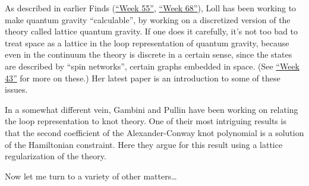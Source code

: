 \documentclass{article}
\renewcommand{\texttt}[1]{%
  \begingroup
  \ttfamily
  \begingroup\lccode`~=`/\lowercase{\endgroup\def~}{/\discretionary{}{}{}}%
  \begingroup\lccode`~=`[\lowercase{\endgroup\def~}{[\discretionary{}{}{}}%
  \begingroup\lccode`~=`.\lowercase{\endgroup\def~}{.\discretionary{}{}{}}%
  \catcode`/=\active\catcode`[=\active\catcode`.=\active
  \scantokens{#1\noexpand}%
  \endgroup
}
\begin{document}
As described in earlier Finds (\protect\hyperlink{week55}{``Week 55''},
\protect\hyperlink{week68}{``Week 68''}), Loll has been working to make
quantum gravity ``calculable'', by working on a discretized version of
the theory called lattice quantum gravity. If one does it carefully,
it's not too bad to treat space as a lattice in the loop representation
of quantum gravity, because even in the continuum the theory is discrete
in a certain sense, since the states are described by ``spin networks'',
certain graphs embedded in space. (See \protect\hyperlink{week43}{``Week
43''} for more on these.) Her latest paper is an introduction to some of
these issues.

In a somewhat different vein, Gambini and Pullin have been working on
relating the loop representation to knot theory. One of their most
intriguing results is that the second coefficient of the
Alexander-Conway knot polynomial is a solution of the Hamiltonian
constraint. Here they argue for this result using a lattice
regularization of the theory.

Now let me turn to a variety of other matters\ldots{}

\end{document}
